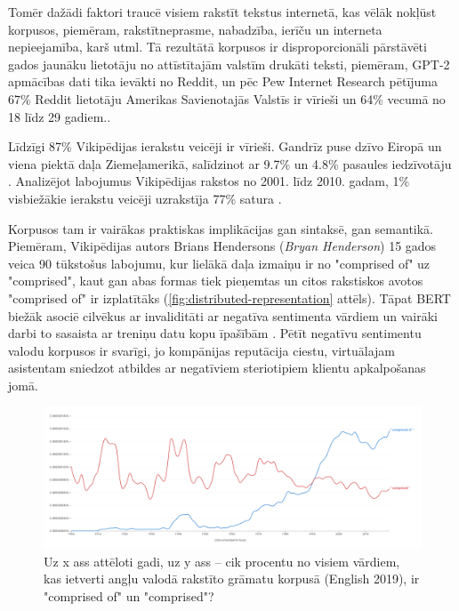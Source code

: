 Tomēr dažādi faktori traucē visiem rakstīt tekstus internetā, kas vēlāk nokļūst korpusos, piemēram, rakstītneprasme, nabadzība, ierīču un interneta nepieejamība, karš utml. Tā rezultātā korpusos ir disproporcionāli pārstāvēti gados jaunāku lietotāju no attīstītajām valstīm drukāti teksti, piemēram, GPT-2 apmācības dati tika ievākti no Reddit, un pēc Pew Internet Research pētījuma 67\% Reddit lietotāju Amerikas Savienotajās Valstīs ir vīrieši un 64\% vecumā no 18 līdz 29 gadiem.\cite{bender2021}.

Līdzīgi 87\% Vikipēdijas ierakstu veicēji ir vīrieši. Gandrīz puse dzīvo Eiropā un viena piektā daļa Ziemeļamerikā, salīdzinot ar 9.7\% un 4.8\% pasaules iedzīvotāju \cite{wikimedia2020}. Analizējot labojumus Vikipēdijas rakstos no 2001. līdz 2010. gadam, 1\% visbiežākie ierakstu veicēji uzrakstīja 77\% satura \cite{1percent}.

Korpusos tam ir vairākas praktiskas implikācijas gan sintaksē, gan semantikā. Piemēram, Vikipēdijas autors Brians Hendersons (\textit{Bryan Henderson}) 15 gados veica 90 tūkstošus labojumu, kur lielākā daļa izmaiņu ir no "comprised of" uz "comprised", kaut gan abas formas tiek pieņemtas un citos rakstiskos avotos "comprised of" ir izplatītāks (\ref{fig:distributed-representation} attēls). Tāpat BERT biežāk asociē cilvēkus ar invaliditāti ar negatīva sentimenta vārdiem un vairāki darbi to sasaista ar treniņu datu kopu īpašībām \cite{bender2021}. Pētīt negatīvu sentimentu valodu korpusos ir svarīgi, jo kompānijas reputācija ciestu, virtuālajam asistentam sniedzot atbildes ar negatīviem steriotipiem klientu apkalpošanas jomā.


\begin{figure}[h]
  \centering
  \includegraphics[width=\textwidth]{figures/comprised.png}
  \caption{Uz x ass attēloti gadi, uz y ass -- cik procentu no visiem vārdiem, kas ietverti angļu valodā rakstīto grāmatu korpusā (English 2019), ir "comprised of" un "comprised"? \cite{ngram-viewer}}
  \label{fig:comprised}
\end{figure}

